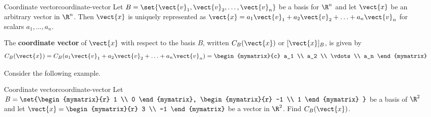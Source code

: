 \begin{definition}{Coordinate vector}{coordinate-vector}
Let $B = \set{\vect{v}_1, \vect{v}_2,\ldots, \vect{v}_n }$
be a basis for $\R^n$ and let $\vect{x}$ be an arbitrary
vector in $\R^n$. Then $\vect{x}$ is uniquely represented as
$\vect{x} = a_1\vect{v}_1 +
a_2\vect{v}_2 + \ldots + a_n\vect{v}_n$ for scalars $a_1,\ldots,
a_n$.

The  \textbf{coordinate vector} of $\vect{x}$ with respect to the
basis $B$, written $C_B(\vect{x})$ or  $[\vect{x}]_B$,  is given by
\[
C_B(\vect{x}) =  C_B (a_1\vect{v}_1 + a_2\vect{v}_2 + \ldots + a_n\vect{v}_n) = \begin{mymatrix}{c}
a_1 \\
a_2 \\
\vdots \\
a_n
\end{mymatrix}
\]
\end{definition}

Consider the following example.

\begin{example}{Coordinate vector}{coordinate-vector}
Let $B = \set{\begin{mymatrix}{r}
1 \\
0
\end{mymatrix}, \begin{mymatrix}{r}
-1 \\
1
\end{mymatrix} }$ be a basis of $\R^2$ and let $\vect{x} = \begin{mymatrix}{r}
3 \\
-1
\end{mymatrix}$ be a vector in $\R^2$. Find $C_B(\vect{x})$.
\end{example}

